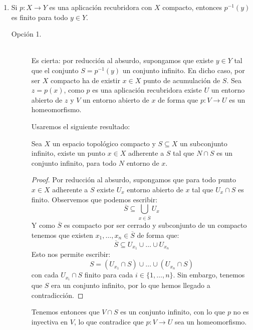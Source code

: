 \documentclass[12pt]{article}
\begin{document}
\begin{ejercicio}
\begin{enumerate}[label=\alph*)]
            \item Si $p:X\to Y$ es una aplicación recubridora con $X$ compacto, entonces $p^{-1}(y)$ es finito para todo $y\in Y$.\\ %

                \begin{description}
                    \item [Opción 1.]~\\
                Es cierta: por reducción al absurdo, supongamos que existe $y\in Y$ tal que el conjunto $S = p^{-1}(y)$ un conjunto infinito. En dicho caso, por ser $X$ compacto ha de existir $x\in X$ punto de acumulación de $S$. Sea $z=p(x)$, como $p$ es una aplicación recubridora existe $U$ un entorno abierto de $z$ y $V$ un entorno abierto de $x$ de forma que $p:V\to U$ es un homeomorfismo.

                Usaremos el siguiente resultado:

                \begin{center}
                    Sea $X$ un espacio topológico compacto y $S\subseteq X$ un subconjunto infinito, existe un punto $x\in X$ adherente a $S$ tal que $N\cap S$ es un conjunto infinito, para todo $N$ entorno de $x$.
                \end{center}
                \begin{proof}
                    Por reducción al absurdo, supongamos que para todo punto $x\in X$ adherente a $S$ existe $U_x$ entorno abierto de $x$ tal que $U_x\cap S$ es finito. Observemos que podemos escribir:
                    \begin{equation*}
                        \overline{S} \subseteq  \bigcup_{x\in \overline{S}}U_x
                    \end{equation*}
                    Y como $\overline{S}$ es compacto por ser cerrado y subconjunto de un compacto tenemos que existen $x_1,\ldots,x_n\in \overline{S}$ de forma que:
                    \begin{equation*}
                        \overline{S} \subseteq  U_{x_1} \cup \ldots \cup U_{x_n}
                    \end{equation*}
                    Esto nos permite escribir:
                    \begin{equation*}
                        S = (U_{x_1}\cap S) \cup \ldots \cup (U_{x_n}\cap S)
                    \end{equation*}
                    con cada $U_{x_i}\cap S$ finito para cada $i \in \{1,\ldots,n\}$. Sin embargo, tenemos que $S$ era un conjunto infinito, por lo que hemos llegado a contradicción.
                \end{proof}
                Tenemos entonces que $V\cap S$ es un conjunto infinito, con lo que $p$ no es inyectiva en $V$, lo que contradice que $p:V\to U$ sea un homeomorfismo.


\end{description}
\end{enumerate}
\end{ejercicio}
\end{document}
